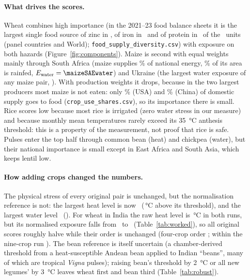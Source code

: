 \paragraph{What drives the scores.} Wheat combines high importance (in the 2021--23 food balance sheets it is
the largest single food source of zinc in \wheatTopZinc, of iron in \wheatTopIron\ and of protein in \wheatTopProtein\ of the \nDivUnits\ units (panel countries and World); \texttt{food\_supply\_diversity.csv}) with exposure on both hazards (Figure~\ref{fig:components}).
Maize is second with equal weights mainly through South Africa (maize supplies \maizeSAkcal\% of national
energy, \maizeSArainfed\% of its area is rainfed, $E_{\text{water}}=\maizeSAEwater$) and Ukraine (the largest water exposure of any
maize pair, \maizeUAEwater). With production weights it drops, because in the two largest producers most maize is not
eaten: only \maizeFoodUSA\% (USA) and \maizeFoodChina\% (China) of domestic supply goes to food (\texttt{crop\_use\_shares.csv}), so
its importance there is small. Rice scores low because
most rice is irrigated (zero water stress in our measure) and because monthly mean temperatures rarely
exceed its \SI{35}{\celsius} anthesis threshold: this is a property of the measurement, not proof that
rice is safe. Pulses enter the top half through common bean (heat) and chickpea (water), but their
national importance is small except in East Africa and South Asia, which keeps lentil low.

\paragraph{How adding crops changed the numbers.} The physical stress of every original pair is unchanged,
but the normalisation reference is not: the largest heat level is now \ (\,\si{\celsius}
above its threshold), and the largest water level \ (). For wheat in India the raw
heat level is \exNineLheatc\,\si{\celsius} in both runs, but its normalised exposure falls from \exFourEheat\
to \exNineEheat\ (Table~\ref{tab:worked}), so all original scores roughly halve while their order is
unchanged (four-crop order \orderOrigFourEq; within the nine-crop run \orderOrigNineEq). The bean reference
is itself uncertain (a chamber-derived threshold from a heat-susceptible Andean bean applied to Indian
``beans'', many of which are tropical \emph{Vigna} pulses); raising bean's threshold by \SI{2}{\celsius}
or all new legumes' by \SI{3}{\celsius} leaves wheat first and bean third (Table~\ref{tab:robust}).

